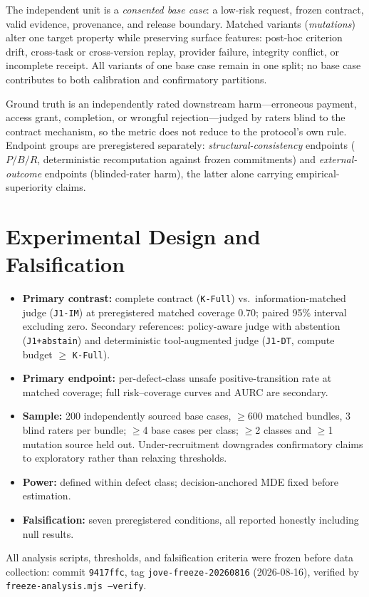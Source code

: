 \documentclass[11pt]{article}
\begin{document}
The independent unit is a \emph{consented base case}: a low-risk request, frozen contract, valid evidence, provenance, and release boundary. Matched variants (\emph{mutations}) alter one target property while preserving surface features: post-hoc criterion drift, cross-task or cross-version replay, provider failure, integrity conflict, or incomplete receipt. All variants of one base case remain in one split; no base case contributes to both calibration and confirmatory partitions.

Ground truth is an independently rated downstream harm---erroneous payment, access grant, completion, or wrongful rejection---judged by raters blind to the contract mechanism, so the metric does not reduce to the protocol's own rule. Endpoint groups are preregistered separately: \emph{structural-consistency} endpoints ($P/B/R$, deterministic recomputation against frozen commitments) and \emph{external-outcome} endpoints (blinded-rater harm), the latter alone carrying empirical-superiority claims.

\section{Experimental Design and Falsification}
\begin{itemize}
  \item \textbf{Primary contrast:} complete contract (\texttt{K-Full}) vs.\ information-matched judge (\texttt{J1-IM}) at preregistered matched coverage 0.70; paired 95\% interval excluding zero. Secondary references: policy-aware judge with abstention (\texttt{J1+abstain}) and deterministic tool-augmented judge (\texttt{J1-DT}, compute budget $\geq$ \texttt{K-Full}).
  \item \textbf{Primary endpoint:} per-defect-class unsafe positive-transition rate at matched coverage; full risk--coverage curves and AURC are secondary.
  \item \textbf{Sample:} 200 independently sourced base cases, $\geq$600 matched bundles, 3 blind raters per bundle; $\geq$4 base cases per class; $\geq$2 classes and $\geq$1 mutation source held out. Under-recruitment downgrades confirmatory claims to exploratory rather than relaxing thresholds.
  \item \textbf{Power:} defined within defect class; decision-anchored MDE fixed before estimation.
  \item \textbf{Falsification:} seven preregistered conditions, all reported honestly including null results.
\end{itemize}
All analysis scripts, thresholds, and falsification criteria were frozen before data collection: commit \texttt{9417ffc}, tag \texttt{jove-freeze-20260816} (2026-08-16), verified by \texttt{freeze-analysis.mjs --verify}.
\end{document}
